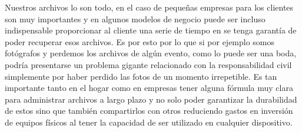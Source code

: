 Nuestros archivos lo son todo, en el caso de pequeñas empresas para los clientes son muy importantes y en algunos modelos de negocio puede ser incluso indispensable proporcionar al cliente una serie de tiempo en se tenga garantía de poder recuperar esos archivos. Es por esto por lo que si por ejemplo somos fotógrafos y perdemos los archivos de algún evento, como lo puede ser una boda, podría presentarse un problema gigante relacionado con la responsabilidad civil simplemente por haber perdido las fotos de un momento irrepetible. Es tan importante tanto en el hogar como en empresas tener alguna fórmula muy clara para administrar archivos a largo plazo y no solo poder garantizar la durabilidad de estos sino que también compartirlos con otros reduciendo gastos en inversión de equipos físicos al tener la capacidad de ser utilizado en cualquier dispositivo.